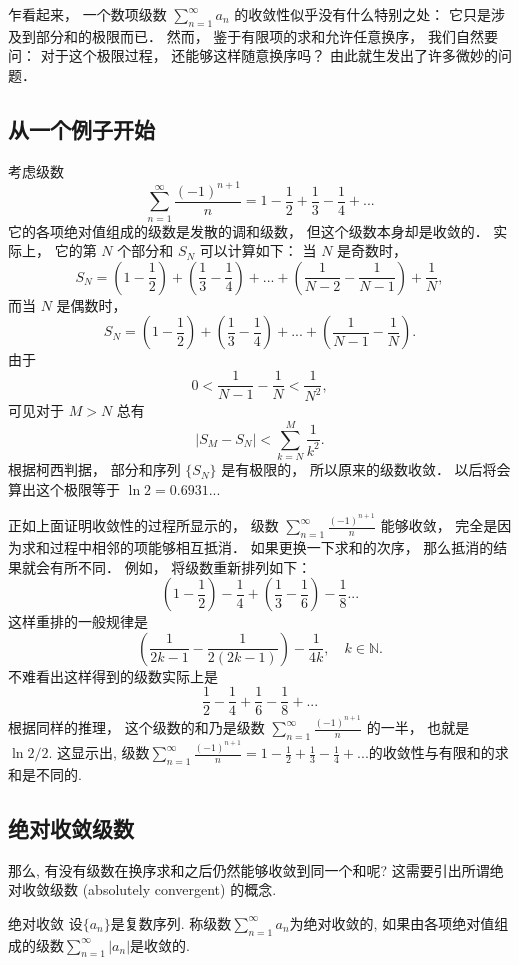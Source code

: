 

乍看起来， 一个数项级数 $\sum_{n=1}^\infty a_n$ 的收敛性似乎没有什么特别之处： 它只是涉及到部分和的极限而已． 然而， 鉴于有限项的求和允许任意换序， 我们自然要问： 对于这个极限过程， 还能够这样随意换序吗？ 由此就生发出了许多微妙的问题．

\subsection{从一个例子开始}

考虑级数
$$
\sum_{n=1}^\infty\frac{(-1)^{n+1}}{n}
=1-\frac{1}{2}+\frac{1}{3}-\frac{1}{4}+...
$$
它的各项绝对值组成的级数是发散的调和级数， 但这个级数本身却是收敛的． 实际上， 它的第 $N$ 个部分和 $S_N$ 可以计算如下： 当 $N$ 是奇数时，
$$
S_N=\left(1-\frac{1}{2}\right)+\left(\frac{1}{3}-\frac{1}{4}\right)+...+\left(\frac{1}{N-2}-\frac{1}{N-1}\right)+\frac{1}{N},
$$
而当 $N$ 是偶数时，
$$
S_N=\left(1-\frac{1}{2}\right)+\left(\frac{1}{3}-\frac{1}{4}\right)+...+\left(\frac{1}{N-1}-\frac{1}{N}\right).
$$
由于
$$
0<\frac{1}{N-1}-\frac{1}{N}<\frac{1}{N^2},
$$
可见对于 $M>N$ 总有
$$
|S_M-S_N|<\sum_{k=N}^M\frac{1}{k^2}.
$$
根据柯西判据， 部分和序列 $\{S_N\}$ 是有极限的， 所以原来的级数收敛． 以后将会算出这个极限等于 $\ln2=0.6931...$

正如上面证明收敛性的过程所显示的， 级数 $\sum_{n=1}^\infty\frac{(-1)^{n+1}}{n}$ 能够收敛， 完全是因为求和过程中相邻的项能够相互抵消． 如果更换一下求和的次序， 那么抵消的结果就会有所不同． 例如， 将级数重新排列如下：
$$
\left(1-\frac{1}{2}\right)-\frac{1}{4}+\left(\frac{1}{3}-\frac{1}{6}\right)-\frac{1}{8}...
$$
这样重排的一般规律是
$$
\left(\frac{1}{2k-1}-\frac{1}{2(2k-1)}\right)-\frac{1}{4k},
\quad k\in\mathbb{N}.
$$
不难看出这样得到的级数实际上是
$$
\frac{1}{2}-\frac{1}{4}+\frac{1}{6}-\frac{1}{8}+...
$$
根据同样的推理， 这个级数的和乃是级数 $\sum_{n=1}^\infty\frac{(-1)^{n+1}}{n}$ 的一半， 也就是 $\ln2/2$. 这显示出, 级数$\sum_{n=1}^\infty\frac{(-1)^{n+1}}{n}
=1-\frac{1}{2}+\frac{1}{3}-\frac{1}{4}+...$的收敛性与有限和的求和是不同的.

\subsection{绝对收敛级数}

那么, 有没有级数在换序求和之后仍然能够收敛到同一个和呢? 这需要引出所谓绝对收敛级数 (absolutely convergent) 的概念.

\begin{definition}{绝对收敛}
设$\{a_n\}$是复数序列. 称级数$\sum_{n=1}^\infty a_n$为绝对收敛的, 如果由各项绝对值组成的级数$\sum_{n=1}^\infty|a_n|$是收敛的.
\end{definition}

